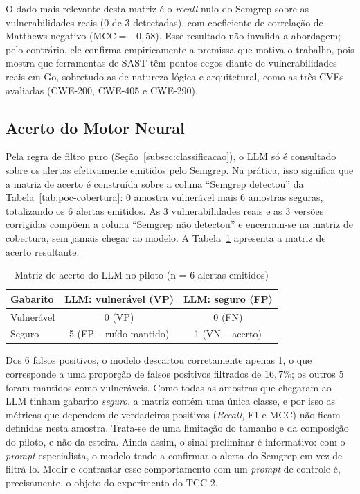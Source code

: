O dado mais relevante desta matriz é o \textit{recall} nulo do Semgrep sobre as vulnerabilidades reais (0 de 3 detectadas), com coeficiente de correlação de Matthews negativo ($\mathrm{MCC} = -0{,}58$). Esse resultado não invalida a abordagem; pelo contrário, ele confirma empiricamente a premissa que motiva o trabalho, pois mostra que ferramentas de SAST têm pontos cegos diante de vulnerabilidades reais em Go, sobretudo as de natureza lógica e arquitetural, como as três CVEs avaliadas (CWE-200, CWE-405 e CWE-290).

\subsection{Acerto do Motor Neural}

Pela regra de filtro puro (Seção~\ref{subsec:classificacao}), o LLM só é consultado sobre os alertas efetivamente emitidos pelo Semgrep. Na prática, isso significa que a matriz de acerto é construída sobre a coluna ``Semgrep detectou'' da Tabela~\ref{tab:poc-cobertura}: 0 amostra vulnerável mais 6 amostras seguras, totalizando os 6 alertas emitidos. As 3 vulnerabilidades reais e as 3 versões corrigidas compõem a coluna ``Semgrep não detectou'' e encerram-se na matriz de cobertura, sem jamais chegar ao modelo. A Tabela~\ref{tab:poc-acerto} apresenta a matriz de acerto resultante.

\begin{table}[htpb]
    \centering
    \caption{Matriz de acerto do LLM no piloto (n = 6 alertas emitidos)}
    \label{tab:poc-acerto}
    \begin{tabular}{|l|c|c|}
        \hline
        \textbf{Gabarito} & \textbf{LLM: vulnerável (VP)} & \textbf{LLM: seguro (FP)} \\
        \hline
        Vulnerável & 0 (VP) & 0 (FN) \\
        \hline
        Seguro & 5 (FP -- ruído mantido) & 1 (VN -- acerto) \\
        \hline
    \end{tabular}
    \fontepesquisa
\end{table}

Dos 6 falsos positivos, o modelo descartou corretamente apenas 1, o que corresponde a uma proporção de falsos positivos filtrados de $16{,}7\%$; os outros 5 foram mantidos como vulneráveis. Como todas as amostras que chegaram ao LLM tinham gabarito \textit{seguro}, a matriz contém uma única classe, e por isso as métricas que dependem de verdadeiros positivos (\textit{Recall}, F1 e MCC) não ficam definidas nesta amostra. Trata-se de uma limitação do tamanho e da composição do piloto, e não da esteira. Ainda assim, o sinal preliminar é informativo: com o \textit{prompt} especialista, o modelo tende a confirmar o alerta do Semgrep em vez de filtrá-lo. Medir e contrastar esse comportamento com um \textit{prompt} de controle é, precisamente, o objeto do experimento do TCC 2.

